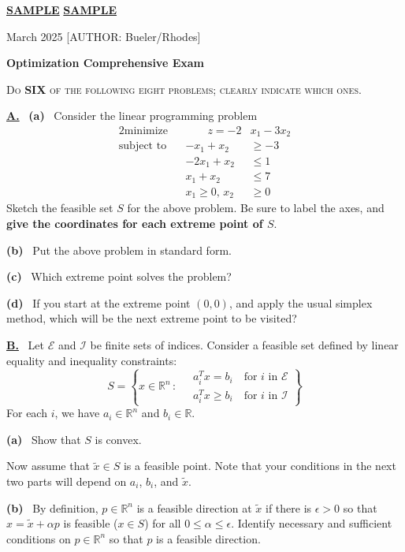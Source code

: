 \documentclass[11pt]{amsart}
\newcommand{\RR}{{\mathbb{R}}}
\newcommand{\eps}{\epsilon}
\newcommand{\prob}[1]{\bigskip\noindent\large\textbf{\underline{#1.}} \, \normalsize}
\newcommand{\apart}[1]{\textbf{(#1)} \,}
\newcommand{\epart}[1]{\medskip\noindent \textbf{(#1)} \,}
\begin{document}
\thispagestyle{empty}
\Large \noindent \underline{\textbf{SAMPLE}} \hfill\underline{\textbf{SAMPLE}}

\scriptsize \noindent March 2025  \hfill  \tiny [AUTHOR: Bueler/Rhodes]
\normalsize\bigskip

\centerline{\large \textbf{Optimization Comprehensive Exam}}
\bigskip

\centerline{\textsc{Do \textbf{SIX} of the following eight problems; clearly indicate which ones.}}
\smallskip

\thispagestyle{empty}

\prob{A}  \apart{a} Consider the linear programming problem
\begin{alignat*}{2}
    \text{minimize}   && \qquad z = - 2 &x_1 - 3 x_2 \\
    \text{subject to} && -x_1 + x_2 &\ge -3 \\
                      && - 2 x_1 + x_2 &\le 1 \\
                      && x_1 + x_2 & \le 7 \\
                      && x_1 \ge 0, \, x_2 &\ge 0
\end{alignat*}
Sketch the feasible set $S$ for the above problem.  Be sure to label the axes, and \textbf{give the coordinates for each extreme point of $S$}.

\epart{b} Put the above problem in standard form.

\epart{c} Which extreme point solves the problem?

\epart{d} If you start at the extreme point $(0,0)$, and apply the usual simplex method, which will be the next extreme point to be visited?


\prob{B}  Let $\mathcal{E}$ and $\mathcal{I}$ be finite sets of indices.  Consider a feasible set defined by linear equality and inequality constraints:
	$$S = \left\{x \in \RR^n\,:\quad \begin{matrix}
	a_i^T x = b_i \quad \text{for $i$ in $\mathcal{E}$} \\
	a_i^T x \ge b_i \quad \text{for $i$ in $\mathcal{I}$}
	\end{matrix}\right\}$$
For each $i$, we have $a_i\in \RR^n$ and $b_i\in\RR$.

\epart{a}  Show that $S$ is convex.

\medskip
\noindent Now assume that $\tilde x\in S$ is a feasible point.  Note that your conditions in the next two parts will depend on $a_i$, $b_i$, and $\tilde x$.

\epart{b}  By definition, $p\in\RR^n$ is a feasible direction at $\tilde x$ if there is $\eps>0$ so that $x = \tilde x + \alpha p$ is feasible ($x\in S$) for all $0\le \alpha \le \eps$.  Identify necessary and sufficient conditions on $p\in\RR^n$ so that $p$ is a feasible direction.
\end{document}
